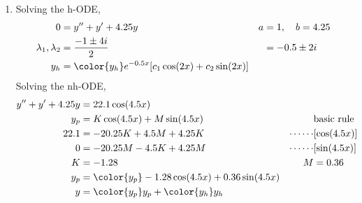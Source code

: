 \begin{enumerate}
    \item Solving the h-ODE,
          \begin{align}
              0                        & = y'' + y' + 4.25y                                       & a & = 1, \quad b = 4.25 \\
              \lambda_{1}, \lambda_{2} & = \frac{-1 \pm 4i}{2}                                    &   & = -0.5 \pm 2i       \\
              y_{h}                    & = \color{y_h} e^{-0.5x}[c_{1} \cos(2x) + c_{2} \sin(2x)]
          \end{align}
          Solving the nh-ODE,
          \begin{align}
              y'' + y' + 4.25y & = 22.1 \cos(4.5x)                                                                   \\
              y_{p}            & = K \cos(4.5x) + M \sin(4.5x)                    &              & \text{basic rule} \\
              22.1             & = -20.25K + 4.5M + 4.25K                         & \cdots\cdots & [\cos(4.5x)]      \\
              0                & = -20.25M - 4.5K + 4.25M                         & \cdots\cdots & [\sin(4.5x)]      \\
              K                & = -1.28                                          & M            & = 0.36            \\
              y_{p}            & = \color{y_p} -1.28 \cos(4.5x) + 0.36 \sin(4.5x)                                    \\
              y                & = {\color{y_p} y_{p}} + {\color{y_h} y_{h}}
          \end{align}


\end{enumerate}
